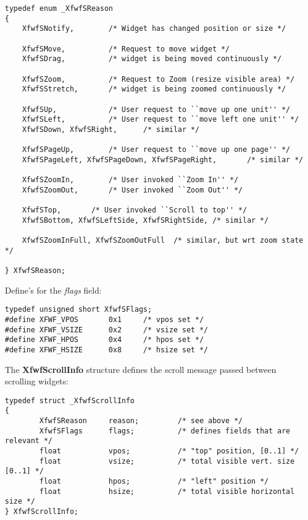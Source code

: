 \begin{verbatim}
typedef enum _XfwfSReason
{
    XfwfSNotify,        /* Widget has changed position or size */

    XfwfSMove,          /* Request to move widget */
    XfwfSDrag,          /* widget is being moved continuously */

    XfwfSZoom,       	/* Request to Zoom (resize visible area) */
    XfwfSStretch,       /* widget is being zoomed continuously */

    XfwfSUp,            /* User request to ``move up one unit'' */
    XfwfSLeft,          /* User request to ``move left one unit'' */
    XfwfSDown, XfwfSRight,      /* similar */

    XfwfSPageUp,        /* User request to ``move up one page'' */
    XfwfSPageLeft, XfwfSPageDown, XfwfSPageRight,       /* similar */

    XfwfSZoomIn,        /* User invoked ``Zoom In'' */
    XfwfSZoomOut,       /* User invoked ``Zoom Out'' */

    XfwfSTop,		/* User invoked ``Scroll to top'' */
    XfwfSBottom, XfwfSLeftSide, XfwfSRightSide, /* similar */

    XfwfSZoomInFull, XfwfSZoomOutFull  /* similar, but wrt zoom state */

} XfwfSReason;
\end{verbatim}

Define's for the {\it flags}\/ field:

\begin{verbatim}
typedef unsigned short XfwfSFlags;
#define XFWF_VPOS       0x1     /* vpos set */
#define XFWF_VSIZE      0x2     /* vsize set */
#define XFWF_HPOS       0x4     /* hpos set */
#define XFWF_HSIZE      0x8     /* hsize set */
\end{verbatim}

The {\bf XfwfScrollInfo} structure defines the scroll message passed
between scrolling widgets:

\begin{verbatim}
typedef struct _XfwfScrollInfo
{
        XfwfSReason     reason;         /* see above */
        XfwfSFlags      flags;          /* defines fields that are relevant */
        float           vpos;           /* "top" position, [0..1] */
        float           vsize;          /* total visible vert. size [0..1] */
        float           hpos;           /* "left" position */
        float           hsize;          /* total visible horizontal size */
} XfwfScrollInfo;
\end{verbatim}

